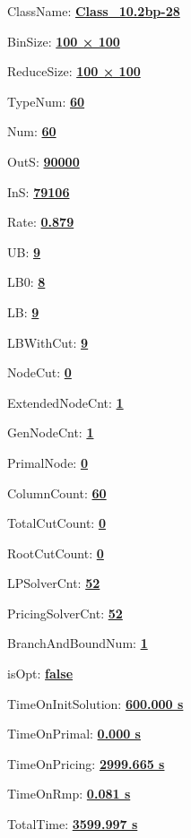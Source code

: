 \documentclass[11pt]{article}
\begin{document}
\pagestyle{empty}


ClassName: \underline{\textbf{Class_10.2bp-28}}
\par
BinSize: \underline{\textbf{100 × 100}}
\par
ReduceSize: \underline{\textbf{100 × 100}}
\par
TypeNum: \underline{\textbf{60}}
\par
Num: \underline{\textbf{60}}
\par
OutS: \underline{\textbf{90000}}
\par
InS: \underline{\textbf{79106}}
\par
Rate: \underline{\textbf{0.879}}
\par
UB: \underline{\textbf{9}}
\par
LB0: \underline{\textbf{8}}
\par
LB: \underline{\textbf{9}}
\par
LBWithCut: \underline{\textbf{9}}
\par
NodeCut: \underline{\textbf{0}}
\par
ExtendedNodeCnt: \underline{\textbf{1}}
\par
GenNodeCnt: \underline{\textbf{1}}
\par
PrimalNode: \underline{\textbf{0}}
\par
ColumnCount: \underline{\textbf{60}}
\par
TotalCutCount: \underline{\textbf{0}}
\par
RootCutCount: \underline{\textbf{0}}
\par
LPSolverCnt: \underline{\textbf{52}}
\par
PricingSolverCnt: \underline{\textbf{52}}
\par
BranchAndBoundNum: \underline{\textbf{1}}
\par
isOpt: \underline{\textbf{false}}
\par
TimeOnInitSolution: \underline{\textbf{600.000 s}}
\par
TimeOnPrimal: \underline{\textbf{0.000 s}}
\par
TimeOnPricing: \underline{\textbf{2999.665 s}}
\par
TimeOnRmp: \underline{\textbf{0.081 s}}
\par
TotalTime: \underline{\textbf{3599.997 s}}
\par
\newpage


\end{document}
